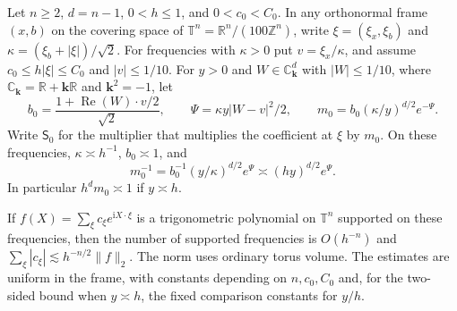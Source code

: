 Let $n\ge2$, $d=n-1$, $0<h\le1$, and $0<c_0<C_0$. In any orthonormal frame $(x,b)$ on the covering space of $\mathbb T^n=\mathbb R^n/(100\mathbb Z^n)$, write $\xi=(\xi_x,\xi_b)$ and $\kappa=(\xi_b+|\xi|)/\sqrt2$. For frequencies with $\kappa>0$ put $v=\xi_x/\kappa$, and assume $c_0\le h|\xi|\le C_0$ and $|v|\le1/10$. For $y>0$ and $W\in\mathbb C_{\mathbf k}^d$ with $|W|\le1/10$, where $\mathbb C_{\mathbf k}=\mathbb R+\mathbf k\mathbb R$ and $\mathbf k^2=-1$, let
\[
 b_0=\frac{1+\operatorname{Re}(W)\cdot v/2}{\sqrt2},\qquad
 \Psi=\kappa y|W-v|^2/2,\qquad
 m_0=b_0(\kappa/y)^{d/2}e^{-\Psi}.
\]
Write $\mathsf S_0$ for the multiplier that multiplies the coefficient at $\xi$ by $m_0$. On these frequencies, $\kappa\asymp h^{-1}$, $b_0\asymp1$, and
\[
 m_0^{-1}=b_0^{-1}(y/\kappa)^{d/2}e^\Psi
     \asymp(hy)^{d/2}e^\Psi .
\]
In particular $h^d m_0\asymp1$ if $y\asymp h$.

If $f(X)=\sum_\xi c_\xi e^{\mathrm i X\cdot\xi}$ is a trigonometric polynomial on $\mathbb T^n$ supported on these frequencies, then the number of supported frequencies is $O(h^{-n})$ and $\sum_\xi|c_\xi|\lesssim h^{-n/2}\|f\|_2$. The norm uses ordinary torus volume. The estimates are uniform in the frame, with constants depending on $n,c_0,C_0$ and, for the two-sided bound when $y\asymp h$, the fixed comparison constants for $y/h$.
